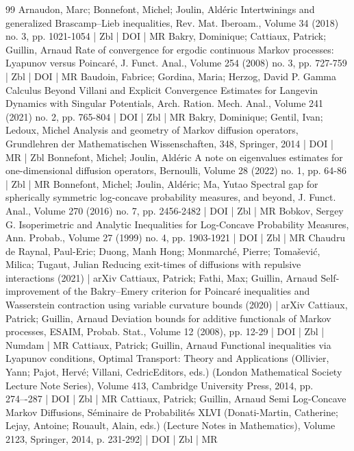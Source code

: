\documentclass[10pt]{amsart}
\theoremstyle{definition}\newtheorem{defi}[theo]{Definition}\newtheorem{rema}[theo]{Remark}\newtheorem{exam}[theo]{Example}\newtheorem{exem}[theo]{Example}\newtheorem{nota}[theo]{Notation}
\newcommand{\1}{\mathbbm{1}}
\begin{document}
\begin{thebibliography}{99}
 Arnaudon, Marc; Bonnefont, Michel; Joulin, Aldéric Intertwinings and generalized Brascamp–Lieb inequalities, Rev. Mat. Iberoam., Volume 34 (2018) no. 3, pp. 1021-1054 | Zbl | DOI | MR
 Bakry, Dominique; Cattiaux, Patrick; Guillin, Arnaud Rate of convergence for ergodic continuous Markov processes: Lyapunov versus Poincaré, J. Funct. Anal., Volume 254 (2008) no. 3, pp. 727-759 | Zbl | DOI | MR
 Baudoin, Fabrice; Gordina, Maria; Herzog, David P. Gamma Calculus Beyond Villani and Explicit Convergence Estimates for Langevin Dynamics with Singular Potentials, Arch. Ration. Mech. Anal., Volume 241 (2021) no. 2, pp. 765-804 | DOI | Zbl | MR
 Bakry, Dominique; Gentil, Ivan; Ledoux, Michel Analysis and geometry of Markov diffusion operators, Grundlehren der Mathematischen Wissenschaften, 348, Springer, 2014 | DOI | MR | Zbl
 Bonnefont, Michel; Joulin, Aldéric A note on eigenvalues estimates for one-dimensional diffusion operators, Bernoulli, Volume 28 (2022) no. 1, pp. 64-86 | Zbl | MR
 Bonnefont, Michel; Joulin, Aldéric; Ma, Yutao Spectral gap for spherically symmetric log-concave probability measures, and beyond, J. Funct. Anal., Volume 270 (2016) no. 7, pp. 2456-2482 | DOI | Zbl | MR
 Bobkov, Sergey G. Isoperimetric and Analytic Inequalities for Log-Concave Probability Measures, Ann. Probab., Volume 27 (1999) no. 4, pp. 1903-1921 | DOI | Zbl | MR
 Chaudru de Raynal, Paul-Eric; Duong, Manh Hong; Monmarché, Pierre; Tomašević, Milica; Tugaut, Julian Reducing exit-times of diffusions with repulsive interactions (2021) | arXiv
 Cattiaux, Patrick; Fathi, Max; Guillin, Arnaud Self-improvement of the Bakry–Emery criterion for Poincaré inequalities and Wasserstein contraction using variable curvature bounds (2020) | arXiv
 Cattiaux, Patrick; Guillin, Arnaud Deviation bounds for additive functionals of Markov processes, ESAIM, Probab. Stat., Volume 12 (2008), pp. 12-29 | DOI | Zbl | Numdam | MR
 Cattiaux, Patrick; Guillin, Arnaud Functional inequalities via Lyapunov conditions, Optimal Transport: Theory and Applications (Ollivier, Yann; Pajot, Hervé; Villani, CedricEditors, eds.) (London Mathematical Society Lecture Note Series), Volume 413, Cambridge University Press, 2014, pp. 274–-287 | DOI | Zbl | MR
 Cattiaux, Patrick; Guillin, Arnaud Semi Log-Concave Markov Diffusions, Séminaire de Probabilités XLVI (Donati-Martin, Catherine; Lejay, Antoine; Rouault, Alain, eds.) (Lecture Notes in Mathematics), Volume 2123, Springer, 2014, p. 231-292] | DOI | Zbl | MR

\end{thebibliography}
\end{document}
